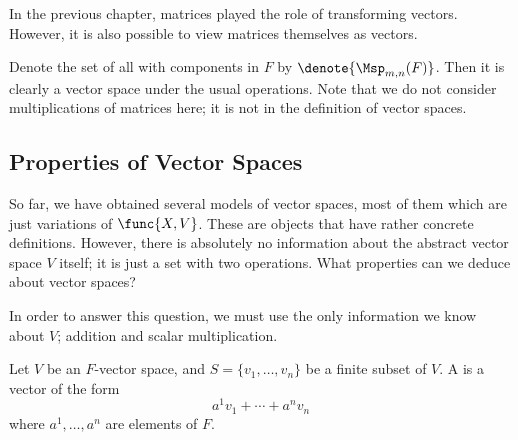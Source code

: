 \begin{example}
    \label{exm:vspmat}
    In the previous chapter,
    matrices played the role of transforming vectors.
    However, it is also possible to view matrices themselves as vectors.

    Denote the set of all  with components in \(F\)
    by \(\denote{\Msp_{m,n}(F)}\).
    Then it is clearly a vector space under the usual operations.
    Note that we do not consider multiplications of matrices here;
    it is not in the definition of vector spaces.
\end{example}

\subsection[Properties]{Properties of Vector Spaces}
\label{sbc:vspprop}

So far, we have obtained several models of vector spaces,
most of them which are just variations of \(\func{X,V}\).
These are objects that have rather concrete definitions.
However, there is absolutely no information
about the abstract vector space \(V\) itself;
it is just a set with two operations.
What properties can we deduce about vector spaces?

In order to answer this question,
we must use the only information we know about \(V\);
addition and scalar multiplication.

\begin{definition*}
    \label{def:lincombi}
    Let \(V\) be an \(F\)-vector space,
    and \(S=\{v_1,\dots,v_n\}\) be a finite subset of \(V\).
    A 
    is a vector of the form
    \[
        a^1v_1+\cdots+a^nv_n
    \]
    where \(a^1,\dots,a^n\) are elements of \(F\).
\end{definition*}
